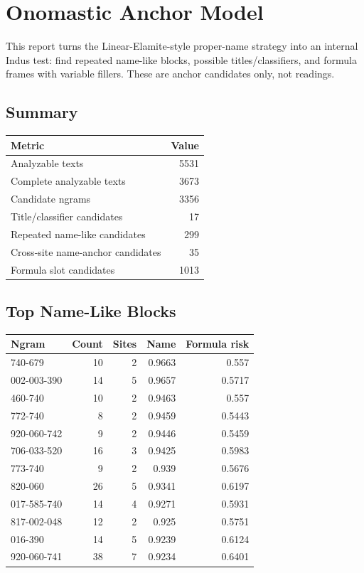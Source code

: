 \documentclass[11pt,a4paper]{article}
\begin{document}
\section*{Onomastic Anchor Model}
This report turns the Linear-Elamite-style proper-name strategy into an internal Indus test: find repeated name-like blocks, possible titles/classifiers, and formula frames with variable fillers. These are anchor candidates only, not readings.
\subsection*{Summary}
\begin{center}
\begin{tabular}{lr}
\toprule
\textbf{Metric} & \textbf{Value} \\
\midrule
Analyzable texts & 5531 \\
Complete analyzable texts & 3673 \\
Candidate ngrams & 3356 \\
Title/classifier candidates & 17 \\
Repeated name-like candidates & 299 \\
Cross-site name-anchor candidates & 35 \\
Formula slot candidates & 1013 \\
\bottomrule
\end{tabular}
\end{center}
\subsection*{Top Name-Like Blocks}
\begin{center}
\begin{tabular}{lrrrr}
\toprule
\textbf{Ngram} & \textbf{Count} & \textbf{Sites} & \textbf{Name} & \textbf{Formula risk} \\
\midrule
740-679 & 10 & 2 & 0.9663 & 0.557 \\
002-003-390 & 14 & 5 & 0.9657 & 0.5717 \\
460-740 & 10 & 2 & 0.9463 & 0.557 \\
772-740 & 8 & 2 & 0.9459 & 0.5443 \\
920-060-742 & 9 & 2 & 0.9446 & 0.5459 \\
706-033-520 & 16 & 3 & 0.9425 & 0.5983 \\
773-740 & 9 & 2 & 0.939 & 0.5676 \\
820-060 & 26 & 5 & 0.9341 & 0.6197 \\
017-585-740 & 14 & 4 & 0.9271 & 0.5931 \\
817-002-048 & 12 & 2 & 0.925 & 0.5751 \\
016-390 & 14 & 5 & 0.9239 & 0.6124 \\
920-060-741 & 38 & 7 & 0.9234 & 0.6401 \\
\bottomrule
\end{tabular}
\end{center}
\end{document}
